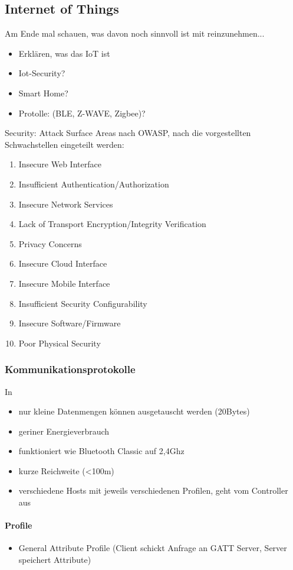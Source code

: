 \subsection{Internet of Things}
\label{sec:sota_iot}
    Am Ende mal schauen, was davon noch sinnvoll ist mit reinzunehmen... 
    \begin{itemize}
        \item Erklären, was das IoT ist
        \item Iot-Security?
        \item Smart Home?
        \item Protolle: (BLE, Z-WAVE, Zigbee)?
    \end{itemize}

    Security:
    Attack Surface Areas nach OWASP, nach die vorgestellten Schwachstellen eingeteilt werden:
    \begin{enumerate}[noitemsep]
        \item Insecure Web Interface
        \item Insufficient Authentication/Authorization
        \item Insecure Network Services
        \item Lack of Transport Encryption/Integrity Verification
        \item Privacy Concerns
        \item Insecure Cloud Interface
        \item Insecure Mobile Interface
        \item Insufficient Security Configurability
        \item Insecure Software/Firmware
        \item Poor Physical Security
    \end{enumerate}

\subsubsection{Kommunikationsprotokolle}
\label{sec:sota_iot_protocols}
    \cite{Gomez2012}
    In \cite{Rose2016}
    \begin{itemize}
        \item nur kleine Datenmengen können ausgetauscht werden (20Bytes)\cite{Rose2016}
        \item geriner Energieverbrauch
        \item funktioniert wie Bluetooth Classic auf 2,4Ghz
        \item kurze Reichweite (<100m)
        \item verschiedene Hosts mit jeweils verschiedenen Profilen, geht vom Controller aus
    \end{itemize}
    
    \paragraph{Profile}\cite{Rose2016}
        \begin{itemize}
            \item General Attribute Profile (Client schickt Anfrage an GATT Server, Server speichert Attribute)
        \end{itemize}
